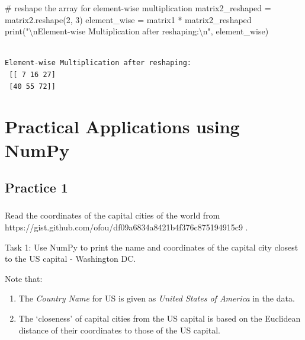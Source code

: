 \documentclass[
  letterpaper,
  DIV=11,
  numbers=noendperiod]{scrreprt}
\newenvironment{Shaded}{\begin{snugshade}}{\end{snugshade}}
\newcommand{\BuiltInTok}[1]{\textcolor[rgb]{0.00,0.23,0.31}{#1}}
\newcommand{\CharTok}[1]{\textcolor[rgb]{0.13,0.47,0.30}{#1}}
\newcommand{\CommentTok}[1]{\textcolor[rgb]{0.37,0.37,0.37}{#1}}
\newcommand{\DecValTok}[1]{\textcolor[rgb]{0.68,0.00,0.00}{#1}}
\newcommand{\NormalTok}[1]{\textcolor[rgb]{0.00,0.23,0.31}{#1}}
\newcommand{\OperatorTok}[1]{\textcolor[rgb]{0.37,0.37,0.37}{#1}}
\newcommand{\StringTok}[1]{\textcolor[rgb]{0.13,0.47,0.30}{#1}}
\providecommand{\tightlist}{%
  \setlength{\itemsep}{0pt}\setlength{\parskip}{0pt}}\usepackage{longtable,booktabs,array}
\begin{document}
\begin{Shaded}
\begin{Highlighting}[]
\CommentTok{\# reshape the array for element{-}wise multiplication}
\NormalTok{matrix2\_reshaped }\OperatorTok{=}\NormalTok{ matrix2.reshape(}\DecValTok{2}\NormalTok{, }\DecValTok{3}\NormalTok{)}
\NormalTok{element\_wise }\OperatorTok{=}\NormalTok{ matrix1 }\OperatorTok{*}\NormalTok{ matrix2\_reshaped}
\BuiltInTok{print}\NormalTok{(}\StringTok{"}\CharTok{\textbackslash{}n}\StringTok{Element{-}wise Multiplication after reshaping:}\CharTok{\textbackslash{}n}\StringTok{"}\NormalTok{, element\_wise)}
\end{Highlighting}
\end{Shaded}

\begin{verbatim}

Element-wise Multiplication after reshaping:
 [[ 7 16 27]
 [40 55 72]]
\end{verbatim}

\hypertarget{practical-applications-using-numpy}{%
\section{Practical Applications using
NumPy}\label{practical-applications-using-numpy}}

\hypertarget{practice-1}{%
\subsection{Practice 1}\label{practice-1}}

\hypertarget{section-17}{%
\subsubsection{}\label{section-17}}

Read the coordinates of the capital cities of the world from
https://gist.github.com/ofou/df09a6834a8421b4f376c875194915c9 .

Task 1: Use NumPy to print the name and coordinates of the capital city
closest to the US capital - Washington DC.

Note that:

\begin{enumerate}
\def\labelenumi{\arabic{enumi}.}
\tightlist
\item
  The \emph{Country Name} for US is given as \emph{United States of
  America} in the data.
\item
  The `closeness' of capital cities from the US capital is based on the
  Euclidean distance of their coordinates to those of the US capital.
\end{enumerate}
\end{document}
